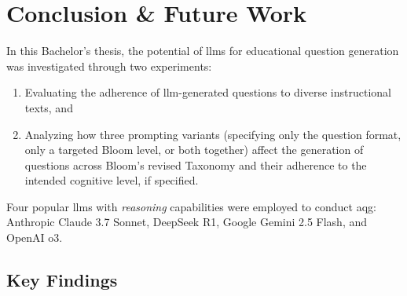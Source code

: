 \section{Conclusion \& Future Work} \label{sec:conclusion-and-future-work}

In this Bachelor's thesis, the potential of \acp{llm} for educational question generation was investigated through two experiments: 

\begin{enumerate}
  \item Evaluating the adherence of \ac{llm}-generated questions to diverse instructional texts, and
  \item Analyzing how three prompting variants (specifying only the question format, only a targeted Bloom level, or both together) affect the generation of questions across Bloom's revised Taxonomy and their adherence to the intended cognitive level, if specified.
\end{enumerate}

Four popular \acp{llm} with \textit{reasoning} capabilities were employed to conduct \ac{aqg}: Anthropic Claude 3.7 Sonnet, DeepSeek R1, Google Gemini 2.5 Flash, and OpenAI o3.

\subsection{Key Findings}



